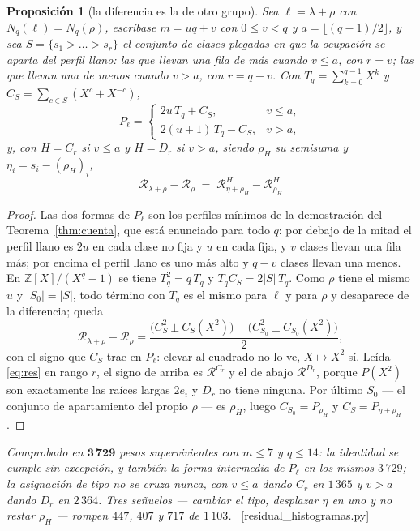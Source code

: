 \documentclass[11pt,a4paper]{article}
\newtheorem{proposition}[theorem]{Proposición}
\newcommand{\ver}[1]{\unskip\penalty0\ \textcolor{azul}{\small\textsf{[#1]}}}
\begin{document}
\begin{proposition}[la diferencia es la de otro grupo]\label{prop:resid}
Sea $\ell=\lambda+\rho$ con $N_q(\ell)=N_q(\rho)$, escríbase $m=uq+v$ con $0\le v<q$ y
$a=\lfloor(q-1)/2\rfloor$, y sea $S=\{s_1>\dots>s_r\}$ el conjunto de clases plegadas en que la
ocupación se aparta del perfil llano: las que llevan una fila de más cuando $v\le a$, con $r=v$;
las que llevan una de menos cuando $v>a$, con $r=q-v$. Con $T_q=\sum_{k=0}^{q-1}X^k$ y
$C_S=\sum_{c\in S}(X^c+X^{-c})$,
\[
P_\ell=\begin{cases}2u\,T_q+C_S, & v\le a,\\[1mm] 2(u+1)\,T_q-C_S, & v>a,\end{cases}
\]
y, con $H=C_r$ si $v\le a$ y $H=D_r$ si $v>a$, siendo $\rho_H$ su semisuma y
$\eta_i=s_i-(\rho_H)_i$,
\[
\boxed{\;\mathscr{R}_{\lambda+\rho}-\mathscr{R}_{\rho}
\;=\;\mathscr{R}^{H}_{\eta+\rho_H}-\mathscr{R}^{H}_{\rho_H}\;}
\]
\end{proposition}

\begin{proof}
Las dos formas de $P_\ell$ son los perfiles mínimos de la demostración del
Teorema~\ref{thm:cuenta}, que está enunciado para todo $q$: por debajo de
la mitad el perfil llano es $2u$ en cada clase no fija y $u$ en cada fija, y $v$ clases llevan una
fila más; por encima el perfil llano es uno más alto y $q-v$ clases llevan una menos. En
$\mathbb{Z}[X]/(X^q-1)$ se tiene $T_q^2=q\,T_q$ y $T_qC_S=2|S|\,T_q$. Como $\rho$ tiene el mismo
$u$ y $|S_0|=|S|$, todo término con $T_q$ es el mismo para $\ell$ y para $\rho$ y desaparece de la
diferencia; queda
\[
\mathscr{R}_{\lambda+\rho}-\mathscr{R}_\rho
=\frac{\bigl(C_S^2\pm C_S(X^2)\bigr)-\bigl(C_{S_0}^2\pm C_{S_0}(X^2)\bigr)}{2},
\]
con el signo que $C_S$ trae en $P_\ell$: elevar al cuadrado no lo ve, $X\mapsto X^2$ sí. Leída
\eqref{eq:res} en rango $r$, el signo de arriba es $\mathscr{R}^{C_r}$ y el de abajo
$\mathscr{R}^{D_r}$, porque $P(X^2)$ son exactamente las raíces largas $2e_i$ y $D_r$ no tiene
ninguna. Por último $S_0$ --- el conjunto de apartamiento del propio $\rho$ --- es $\rho_H$, luego
$C_{S_0}=P_{\rho_H}$ y $C_S=P_{\eta+\rho_H}$.
\end{proof}

\noindent \emph{Comprobado en $\mathbf{3\,729}$ pesos supervivientes con $m\le7$ y $q\le14$: la
identidad se cumple sin excepción, y también la forma intermedia de $P_\ell$ en los mismos
$3\,729$; la asignación de tipo no se cruza nunca, con $v\le a$ dando $C_r$ en $1\,365$ y $v>a$
dando $D_r$ en $2\,364$. Tres señuelos --- cambiar el tipo, desplazar $\eta$ en uno y no restar
$\rho_H$ --- rompen $447$, $407$ y $717$ de $1\,103$.}
\ver{residual\_histogramas.py}
\end{document}
